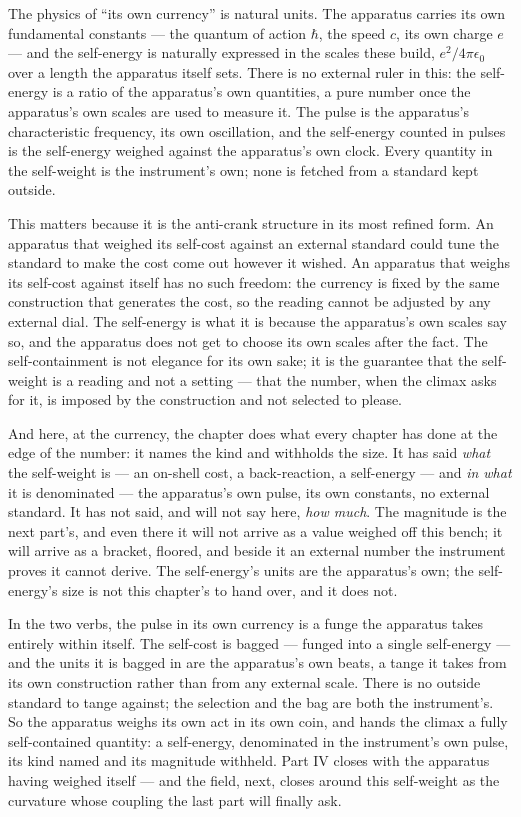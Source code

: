 The physics of ``its own currency'' is natural units. The apparatus carries its own fundamental constants --- the quantum of
action $\hbar$, the speed $c$, its own charge $e$ --- and the self-energy is naturally expressed in the scales these build,
$e^2 / 4\pi\epsilon_0$ over a length the apparatus itself sets. There is no external ruler in this: the self-energy is a ratio
of the apparatus's own quantities, a pure number once the apparatus's own scales are used to measure it. The pulse is the
apparatus's characteristic frequency, its own oscillation, and the self-energy counted in pulses is the self-energy weighed
against the apparatus's own clock. Every quantity in the self-weight is the instrument's own; none is fetched from a standard
kept outside.

This matters because it is the anti-crank structure in its most refined form. An apparatus that weighed its self-cost against
an external standard could tune the standard to make the cost come out however it wished. An apparatus that weighs its
self-cost against itself has no such freedom: the currency is fixed by the same construction that generates the cost, so the
reading cannot be adjusted by any external dial. The self-energy is what it is because the apparatus's own scales say so, and
the apparatus does not get to choose its own scales after the fact. The self-containment is not elegance for its own sake; it
is the guarantee that the self-weight is a reading and not a setting --- that the number, when the climax asks for it, is
imposed by the construction and not selected to please.

And here, at the currency, the chapter does what every chapter has done at the edge of the number: it names the kind and
withholds the size. It has said \emph{what} the self-weight is --- an on-shell cost, a back-reaction, a self-energy --- and
\emph{in what} it is denominated --- the apparatus's own pulse, its own constants, no external standard. It has not said, and
will not say here, \emph{how much}. The magnitude is the next part's, and even there it will not arrive as a value weighed
off this bench; it will arrive as a bracket, floored, and beside it an external number the instrument proves it cannot
derive. The self-energy's units are the apparatus's own; the self-energy's size is not this chapter's to hand over, and it
does not.

In the two verbs, the pulse in its own currency is a funge the apparatus takes entirely within itself. The self-cost is
bagged --- funged into a single self-energy --- and the units it is bagged in are the apparatus's own beats, a tange it takes
from its own construction rather than from any external scale. There is no outside standard to tange against; the selection
and the bag are both the instrument's. So the apparatus weighs its own act in its own coin, and hands the climax a fully
self-contained quantity: a self-energy, denominated in the instrument's own pulse, its kind named and its magnitude withheld.
Part IV closes with the apparatus having weighed itself --- and the field, next, closes around this self-weight as the
curvature whose coupling the last part will finally ask.
